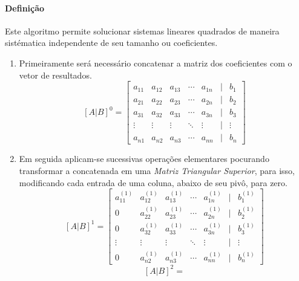 \documentclass{article}
\begin{document}
        \paragraph{Definição}Este algoritmo permite solucionar sistemas lineares quadrados de maneira sistématica independente de seu tamanho ou coeficientes.
            \begin{enumerate}[noitemsep]
                \item Primeiramente será necessário concatenar a matriz dos coeficientes com o vetor de resultados.
                    \[[A|B]^{0}=
                        \begin{bmatrix}
                            a_{11} & a_{12} & a_{13} & \cdots & a_{1n} & | & b_{1}\\
                            a_{21} & a_{22} & a_{23} & \cdots & a_{2n} & | & b_{2}\\
                            a_{31} & a_{32} & a_{33} & \cdots & a_{3n} & | & b_{3}\\
                            \vdots & \vdots & \vdots & \ddots & \vdots & | & \vdots\\
                            a_{n1} & a_{n2} & a_{n3} & \cdots & a_{nn} & | & b_{n}
                        \end{bmatrix} 
                    \]
                \item Em seguida aplicam-se sucessivas operações elementares pocurando transformar a concatenada em uma \textit{Matriz Triangular Superior}, para isso, modificando cada entrada de uma coluna, abaixo de seu pivô, para zero.
                    \[[A|B]^{1}=
                        \begin{bmatrix}
                            a_{11}^{(1)} & a_{12}^{(1)} & a_{13}^{(1)} & \cdots & a_{1n}^{(1)} & | & b_{1}^{(1)}\\
                            0            & a_{22}^{(1)} & a_{23}^{(1)} & \cdots & a_{2n}^{(1)} & | & b_{2}^{(1)}\\
                            0            & a_{32}^{(1)} & a_{33}^{(1)} & \cdots & a_{3n}^{(1)} & | & b_{3}^{(1)}\\
                            \vdots       & \vdots       & \vdots       & \ddots & \vdots       & | & \vdots\\
                            0            & a_{n2}^{(1)} & a_{n3}^{(1)} & \cdots & a_{nn}^{(1)} & | & b_{n}^{(1)}
                        \end{bmatrix}
                    \]
                    \[[A|B]^{2}=
\]
\end{enumerate}
\end{document}
